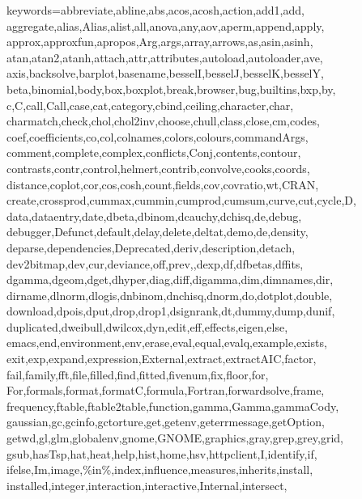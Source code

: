 \def\zz{\ifx\[$\else\aftergroup\zzz\fi}
\def\zzz{\setbox0\lastbox
\dimen0\dimexpr\extrarowheight + \ht0-\dp0\relax
\setbox0\hbox{\raise-.5\dimen0\box0}%
\ht0=\dimexpr\ht0+\extrarowheight\relax
\dp0=\dimexpr\dp0+\extrarowheight\relax 
\box0
}



%
{keywords={abbreviate,abline,abs,acos,acosh,action,add1,add,%
        aggregate,alias,Alias,alist,all,anova,any,aov,aperm,append,apply,%
        approx,approxfun,apropos,Arg,args,array,arrows,as,asin,asinh,%
        atan,atan2,atanh,attach,attr,attributes,autoload,autoloader,ave,%
        axis,backsolve,barplot,basename,besselI,besselJ,besselK,besselY,%
        beta,binomial,body,box,boxplot,break,browser,bug,builtins,bxp,by,%
        c,C,call,Call,case,cat,category,cbind,ceiling,character,char,%
        charmatch,check,chol,chol2inv,choose,chull,class,close,cm,codes,%
        coef,coefficients,co,col,colnames,colors,colours,commandArgs,%
        comment,complete,complex,conflicts,Conj,contents,contour,%
        contrasts,contr,control,helmert,contrib,convolve,cooks,coords,%
        distance,coplot,cor,cos,cosh,count,fields,cov,covratio,wt,CRAN,%
        create,crossprod,cummax,cummin,cumprod,cumsum,curve,cut,cycle,D,%
        data,dataentry,date,dbeta,dbinom,dcauchy,dchisq,de,debug,%
        debugger,Defunct,default,delay,delete,deltat,demo,de,density,%
        deparse,dependencies,Deprecated,deriv,description,detach,%
        dev2bitmap,dev,cur,deviance,off,prev,,dexp,df,dfbetas,dffits,%
        dgamma,dgeom,dget,dhyper,diag,diff,digamma,dim,dimnames,dir,%
        dirname,dlnorm,dlogis,dnbinom,dnchisq,dnorm,do,dotplot,double,%
        download,dpois,dput,drop,drop1,dsignrank,dt,dummy,dump,dunif,%
        duplicated,dweibull,dwilcox,dyn,edit,eff,effects,eigen,else,%
        emacs,end,environment,env,erase,eval,equal,evalq,example,exists,%
        exit,exp,expand,expression,External,extract,extractAIC,factor,%
        fail,family,fft,file,filled,find,fitted,fivenum,fix,floor,for,%
        For,formals,format,formatC,formula,Fortran,forwardsolve,frame,%
        frequency,ftable,ftable2table,function,gamma,Gamma,gammaCody,%
        gaussian,gc,gcinfo,gctorture,get,getenv,geterrmessage,getOption,%
        getwd,gl,glm,globalenv,gnome,GNOME,graphics,gray,grep,grey,grid,%
        gsub,hasTsp,hat,heat,help,hist,home,hsv,httpclient,I,identify,if,%
        ifelse,Im,image,\%in\%,index,influence,measures,inherits,install,%
        installed,integer,interaction,interactive,Internal,intersect,%
}}
